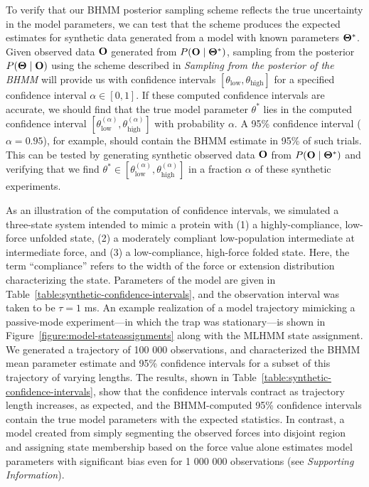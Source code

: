 \documentclass[aps,pre,twocolumn,superscriptaddress,nofootinbib,longbibliography]{revtex4-1}
\newcommand{\bfm}[1]{{\bf #1}}
\begin{document}
{To verify that our BHMM posterior sampling scheme reflects the true uncertainty in the model parameters, we can test that the scheme produces the expected estimates for synthetic data generated from a model with known parameters $\bfm{\Theta}^*$. 
Given observed data $\bfm{O}$ generated from $P(\bfm{O} \mid \bfm{\Theta}^*)$, sampling from the posterior $P(\bfm{\Theta} \mid \bfm{O})$ using the scheme described in \color{blue} \emph{Sampling from the posterior of the BHMM} \color{black} will provide us with confidence intervals $[\theta_\mathrm{low}, \theta_\mathrm{high}]$ for a specified confidence interval $\alpha \in [0,1]$.
If these computed confidence intervals are accurate, we should find that the true model parameter $\theta^*$ lies in the computed confidence interval $[\theta^{(\alpha)}_\mathrm{low}, \theta^{(\alpha)}_\mathrm{high}]$ with probability $\alpha$.
A 95\% confidence interval ($\alpha = 0.95$), for example, should contain the BHMM estimate in 95\% of such trials.
This can be tested by generating synthetic observed data $\bfm{O}$ from $P(\bfm{O} \mid \bfm{\Theta}^*)$ and verifying that we find $\theta^* \in [\theta^{(\alpha)}_\mathrm{low}, \theta^{(\alpha)}_\mathrm{high}]$ in a fraction $\alpha$ of these synthetic experiments.

\color{red}
As an illustration of the computation of confidence intervals, we simulated a three-state system intended to mimic a protein with (1) a highly-compliance, low-force unfolded state, (2) a moderately compliant low-population intermediate at intermediate force, and (3) a low-compliance, high-force folded state.
Here, the term ``compliance'' refers to the width of the force or extension distribution characterizing the state.
Parameters of the model are given in Table~\ref{table:synthetic-confidence-intervals}, and the observation interval was taken to be $\tau = 1$ ms.
An example realization of a model trajectory mimicking a passive-mode experiment---in which the trap was stationary---is shown in Figure~\ref{figure:model-stateassignments} along with the MLHMM state assignment.
\color{black}
We generated a trajectory of 100 000 observations, and characterized the BHMM mean parameter estimate and 95\% confidence intervals for a subset of this trajectory of varying lengths.
The results, shown in Table~\ref{table:synthetic-confidence-intervals}, show that the confidence intervals contract as trajectory length increases, as expected, and the BHMM-computed 95\% confidence intervals contain the true model parameters with the expected statistics.
\color{red}
In contrast, a model created from simply segmenting the observed forces into disjoint region and assigning state membership based on the force value alone estimates model parameters with significant bias even for 1 000 000 observations (see \emph{Supporting Information}).
\color{black}

}
\end{document}
